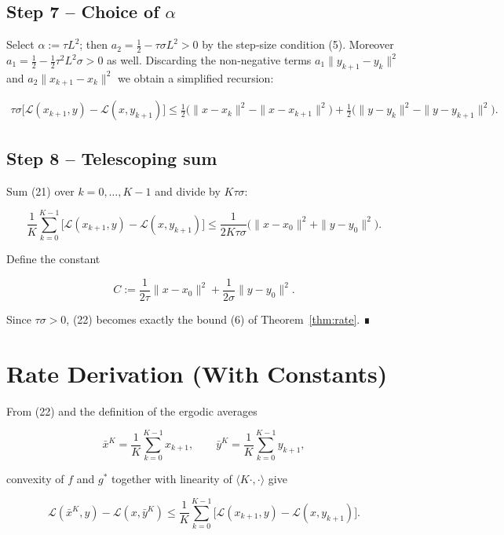 \documentclass{article}
\begin{document}
\subsection*{Step 7 – Choice of $\alpha$}
Select $\alpha:=\tau L^{2}$; then $a_{2}= \tfrac12-\tau\sigma L^{2}>0$ by the step‑size condition (5).  
Moreover $a_{1}= \tfrac12-\tfrac12\tau^{2}L^{2}\sigma>0$ as well.  
Discarding the non‑negative terms $a_{1}\|y_{k+1}-y_{k}\|^{2}$ and $a_{2}\|x_{k+1}-x_{k}\|^{2}$ we obtain a simplified recursion:

\[
\begin{aligned}
\tau\sigma\bigl[\mathcal L(x_{k+1},y)-\mathcal L(x,y_{k+1})\bigr]
\le \tfrac12\bigl(\|x-x_{k}\|^{2}-\|x-x_{k+1}\|^{2}\bigr)
   +\tfrac12\bigl(\|y-y_{k}\|^{2}-\|y-y_{k+1}\|^{2}\bigr). \tag{21}
\end{aligned}
\]

\subsection*{Step 8 – Telescoping sum}
Sum (21) over $k=0,\dots,K-1$ and divide by $K\tau\sigma$:

\[
\frac{1}{K}\sum_{k=0}^{K-1}
\bigl[\mathcal L(x_{k+1},y)-\mathcal L(x,y_{k+1})\bigr]
\le
\frac{1}{2K\tau\sigma}
\bigl(\|x-x_{0}\|^{2}+\|y-y_{0}\|^{2}\bigr). \tag{22}
\]

Define the constant  

\[
C:=\frac{1}{2\tau}\|x-x_{0}\|^{2}+\frac{1}{2\sigma}\|y-y_{0}\|^{2}. \tag{23}
\]

Since $\tau\sigma>0$, (22) becomes exactly the bound (6) of Theorem~\ref{thm:rate}. ∎

\section*{Rate Derivation (With Constants)}
From (22) and the definition of the ergodic averages  

\[
\bar x^{K}=\frac{1}{K}\sum_{k=0}^{K-1}x_{k+1},\qquad
\bar y^{K}=\frac{1}{K}\sum_{k=0}^{K-1}y_{k+1},
\]

convexity of $f$ and $g^{*}$ together with linearity of $\langle K\cdot,\cdot\rangle$ give  

\[
\mathcal L(\bar x^{K},y)-\mathcal L(x,\bar y^{K})
\le\frac{1}{K}\sum_{k=0}^{K-1}
\bigl[\mathcal L(x_{k+1},y)-\mathcal L(x,y_{k+1})\bigr].
\]
\end{document}
